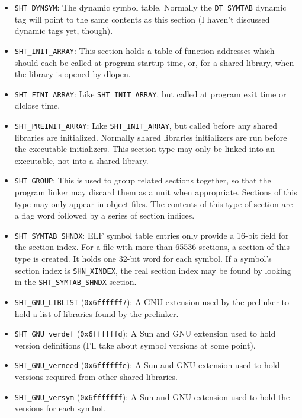 \begin{itemize}
    \item \texttt{SHT\_DYNSYM}: The dynamic symbol table.  Normally the
          \texttt{DT\_SYMTAB} dynamic tag will point to the same contents as this
          section (I haven't discussed dynamic tags yet, though).

    \item \texttt{SHT\_INIT\_ARRAY}: This section holds a table of function
          addresses which should each be called at program startup time, or,
          for a shared library, when the library is opened by dlopen.

    \item \texttt{SHT\_FINI\_ARRAY}: Like \texttt{SHT\_INIT\_ARRAY}, but called at
          program exit time or dlclose time.

    \item \texttt{SHT\_PREINIT\_ARRAY}: Like \texttt{SHT\_INIT\_ARRAY}, but called
          before any shared libraries are initialized.  Normally shared
          libraries initializers are run before the executable initializers.
          This section type may only be linked into an executable, not into a
          shared library.

    \item \texttt{SHT\_GROUP}: This is used to group related sections together, so
          that the program linker may discard them as a unit when appropriate.
          Sections of this type may only appear in object files.  The contents
          of this type of section are a flag word followed by a series of
          section indices.

    \item \texttt{SHT\_SYMTAB\_SHNDX}: ELF symbol table entries only provide a
          16-bit field for the section index.  For a file with more than 65536
          sections, a section of this type is created.  It holds one 32-bit
          word for each symbol.  If a symbol's section index is
          \texttt{SHN\_XINDEX}, the real section index may be found by looking in
          the \texttt{SHT\_SYMTAB\_SHNDX} section.

    \item \texttt{SHT\_GNU\_LIBLIST} (\texttt{0x6ffffff7}): A GNU extension used by
          the prelinker to hold a list of libraries found by the prelinker.

    \item \texttt{SHT\_GNU\_verdef} (\texttt{0x6ffffffd}): A Sun and GNU extension
          used to hold version definitions (I'll take about symbol versions at
          some point).

    \item \texttt{SHT\_GNU\_verneed} (\texttt{0x6ffffffe}): A Sun and GNU extension
          used to hold versions required from other shared libraries.

    \item \texttt{SHT\_GNU\_versym} (\texttt{0x6fffffff}): A Sun and GNU extension
          used to hold the versions for each symbol.
\end{itemize}

